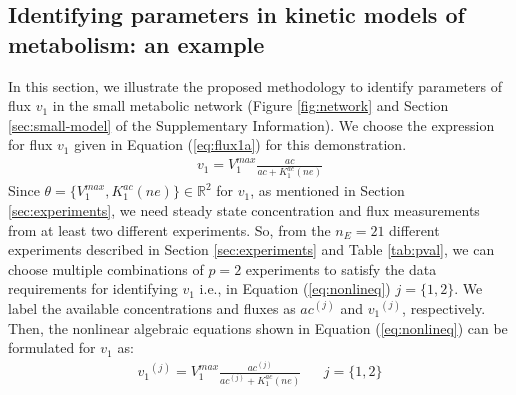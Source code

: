 \documentclass[10pt]{article}
\begin{document}
	\subsection{Identifying parameters in kinetic models of metabolism: an example}\label{sec:example}	
	In this section, we illustrate the proposed methodology to identify parameters of flux $v_1$ in the small metabolic network (Figure \ref{fig:network} and Section \ref{sec:small-model} of the Supplementary Information). We choose the expression for flux $v_1$ given in Equation (\ref{eq:flux1a}) for this demonstration. 
	\begin{align}\tag{S5}
	v_1 = V_1^{max}\frac{ac}{ac+K_{1}^{ac}(ne)}
	\end{align}		
	Since $\theta = \{V_1^{max}, K_1^{ac} (ne)\} \in \mathbb{R}^2$ for $v_1$, as mentioned in Section \ref{sec:experiments}, we need steady state concentration and flux measurements from at least two different experiments. So, from the $n_E = 21$ different experiments described in Section \ref{sec:experiments} and Table \ref{tab:pval}, we can choose multiple combinations of $p = 2$ experiments to satisfy the data requirements for identifying $v_1$ i.e., in Equation (\ref{eq:nonlineq}) $j = \{1, 2\}$. We label the available concentrations and fluxes as ${ac}^{(j)}$ and ${v_1}^{(j)}$, respectively. Then, the nonlinear algebraic equations shown in Equation (\ref{eq:nonlineq}) can be formulated for $v_1$ as:
	\begin{align*}%
	{v_1}^{(j)} = V_{1}^{max}\frac{ac^{(j)}}{ac^{(j)}+K_{1}^{ac}(ne)} &&  j=\{1, 2\}
	\end{align*}
	
\end{document}
